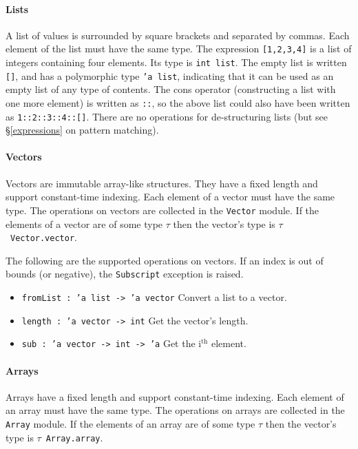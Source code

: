 \documentclass{article}
\begin{document}
\paragraph{Lists} A list of values is surrounded by square brackets and separated by commas. Each element of the list must have the same type. The expression \texttt{[1,2,3,4]} is a list of integers containing four elements. Its type is \texttt{int list}. The empty list is written \texttt{[]}, and has a polymorphic type \texttt{'a list}, indicating that it can be used as an empty list of any type of contents. The cons operator (constructing a list with one more element) is written as \texttt{::}, so the above list could also have been written as \texttt{1::2::3::4::[]}. There are no operations for de-structuring lists (but see \S\ref{expressions} on pattern matching).

\paragraph{Vectors}

Vectors are immutable array-like structures. They have a fixed length and support constant-time indexing. Each element of a vector must have the same type. The operations on vectors are collected in the \texttt{Vector} module. If the elements of a vector are of some type $\tau$ then the vector's type is $\tau$\ \texttt{Vector.vector}.

The following are the supported operations on vectors. If an index is out of bounds (or negative), the \texttt{Subscript} exception is raised.
\begin{itemize}
\item \texttt{fromList : 'a list -> 'a vector} Convert a list to a vector.
\item \texttt{length : 'a vector -> int} Get the vector's length.
\item \texttt{sub : 'a vector -> int -> 'a} Get the i$^\textrm{th}$ element.
\end{itemize}

\paragraph{Arrays}

Arrays have a fixed length and support constant-time indexing. Each element of an array must have the same type. The operations on arrays are collected in the \texttt{Array} module. If the elements of an array are of some type $\tau$ then the vector's type is $\tau$\ \texttt{Array.array}.
\end{document}
